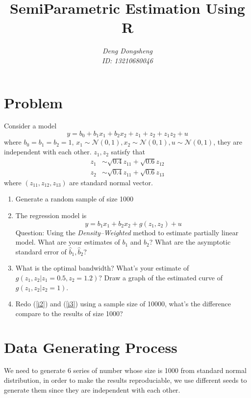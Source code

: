 \documentclass{article}
\title{\bfseries{\color{blue}Semi}{\color{magenta}Parametric} Estimation Using R}
\author{\Large\gara\itshape{{\color{blue}D}eng {\color{magenta}D}ongsheng} \\ ID: 13210680046}
\begin{document}
\maketitle
\section{Problem}
Consider a model
\begin{equation}
y = b_{0} + b_{1}x_{1} + b_{2}x_{2} + z_{1} + z_{2} + z_{1}z_{2} + u
\end{equation}
where $b_{0}=b_{1}=b_{2}=1$, $x_{1}\sim \mathcal{N}(0,1),x_{2} \sim \mathcal{N}(0,1),u\sim\mathcal{N}(0,1)$, they are independent with each other. $z_{1},z_{2}$ satisfy that
\begin{align}
    z_{1} &\sim \sqrt{0.4}z_{11} + \sqrt{0.6} z_{12}\\
    z_{2} &\sim \sqrt{0.4}z_{11} + \sqrt{0.6} z_{13}
\end{align}
where $(z_{11},z_{12},z_{13})$ are standard normal vector.

\begin{enumerate}
    \item Generate a random sample of size 1000
    \item The regression model is \label{i2}
    \begin{equation}
        y = b_{1}x_{1} + b_{2} x_{2} + g(z_{1},z_{2}) + u
    \end{equation}
    Question: Using the \textit{Density--Weighted} method to estimate partially linear model. What are your estimates of $b_{1}$ and $b_{2}$? What are the asymptotic standard error of $\hat{b}_{1},\hat{b}_{2}$?
    \item What is the optimal bandwidth? What\rq{}s your estimate of $g(z_{1},z_{2}| z_{1}=0.5,z_{2}=1.2)$? Draw a graph of the estimated curve of $g(z_{1},z_{2}| z_{2}=1)$.\label{i3}
    \item Redo (\ref{i2}) and (\ref{i3}) using a sample size of 10000, what's the difference compare to the results of size 1000?
\end{enumerate}

\section{Data Generating Process}
We need to generate 6 series of number whose size is 1000 from standard normal distribution, in order to make the results reproduciable, we use different seeds to generate them since they are independent with each other.
\end{document}
